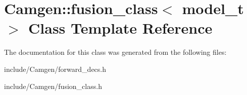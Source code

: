 \hypertarget{a00234}{\section{Camgen\-:\-:fusion\-\_\-class$<$ model\-\_\-t $>$ Class Template Reference}
\label{a00234}
}


The documentation for this class was generated from the following files\-:\begin{DoxyCompactItemize}
\item 
include/\-Camgen/forward\-\_\-decs.\-h\item 
include/\-Camgen/fusion\-\_\-class.\-h\end{DoxyCompactItemize}
